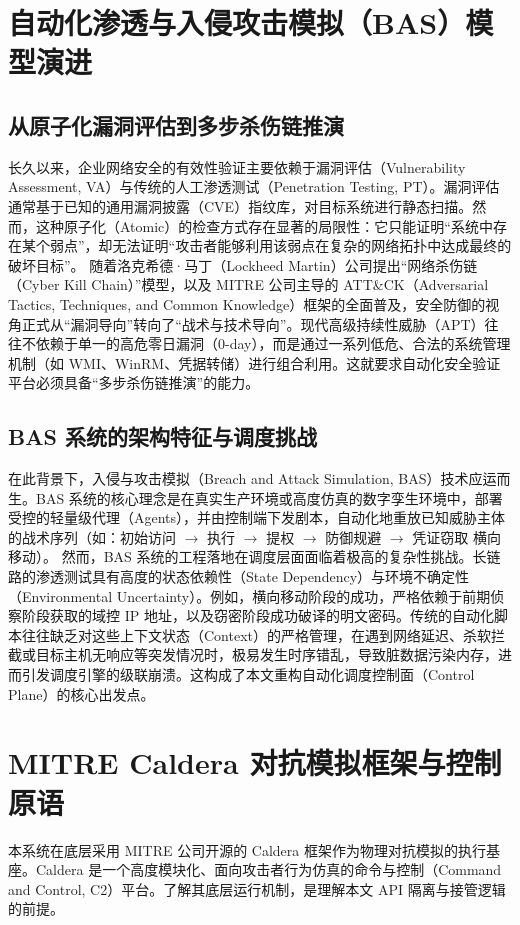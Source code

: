 \documentclass[twoside,openright]{xduugthesis}
\begin{document}
\section{自动化渗透与入侵攻击模拟（BAS）模型演进}

\subsection{从原子化漏洞评估到多步杀伤链推演}

长久以来，企业网络安全的有效性验证主要依赖于漏洞评估（Vulnerability Assessment, VA）与传统的人工渗透测试（Penetration Testing, PT）。漏洞评估通常基于已知的通用漏洞披露（CVE）指纹库，对目标系统进行静态扫描。然而，这种原子化（Atomic）的检查方式存在显著的局限性：它只能证明“系统中存在某个弱点”，却无法证明“攻击者能够利用该弱点在复杂的网络拓扑中达成最终的破坏目标”。
随着洛克希德·马丁（Lockheed Martin）公司提出“网络杀伤链（Cyber Kill Chain）”模型，以及 MITRE 公司主导的 ATT&CK（Adversarial Tactics, Techniques, and Common Knowledge）框架的全面普及，安全防御的视角正式从“漏洞导向”转向了“战术与技术导向”\cite{strom2018mitre}。现代高级持续性威胁（APT）往往不依赖于单一的高危零日漏洞（0-day），而是通过一系列低危、合法的系统管理机制（如 WMI、WinRM、凭据转储）进行组合利用。这就要求自动化安全验证平台必须具备“多步杀伤链推演”的能力。

\subsection{ BAS 系统的架构特征与调度挑战}

在此背景下，入侵与攻击模拟（Breach and Attack Simulation, BAS）技术应运而生。BAS 系统的核心理念是在真实生产环境或高度仿真的数字孪生环境中，部署受控的轻量级代理（Agents），并由控制端下发剧本，自动化地重放已知威胁主体的战术序列（如：初始访问 $\rightarrow$ 执行 $\rightarrow$ 提权 $\rightarrow$ 防御规避 $\rightarrow$ 凭证窃取 \rightarrow 横向移动）\cite{alhaj2023cyber}。
然而，BAS 系统的工程落地在调度层面面临着极高的复杂性挑战。长链路的渗透测试具有高度的状态依赖性（State Dependency）与环境不确定性（Environmental Uncertainty）。例如，横向移动阶段的成功，严格依赖于前期侦察阶段获取的域控 IP 地址，以及窃密阶段成功破译的明文密码。传统的自动化脚本往往缺乏对这些上下文状态（Context）的严格管理，在遇到网络延迟、杀软拦截或目标主机无响应等突发情况时，极易发生时序错乱，导致脏数据污染内存，进而引发调度引擎的级联崩溃。这构成了本文重构自动化调度控制面（Control Plane）的核心出发点。

\section{MITRE Caldera 对抗模拟框架与控制原语}
本系统在底层采用 MITRE 公司开源的 Caldera 框架作为物理对抗模拟的执行基座。Caldera 是一个高度模块化、面向攻击者行为仿真的命令与控制（Command and Control, C2）平台\cite{mitre2024caldera}。了解其底层运行机制，是理解本文 API 隔离与接管逻辑的前提。
\end{document}
